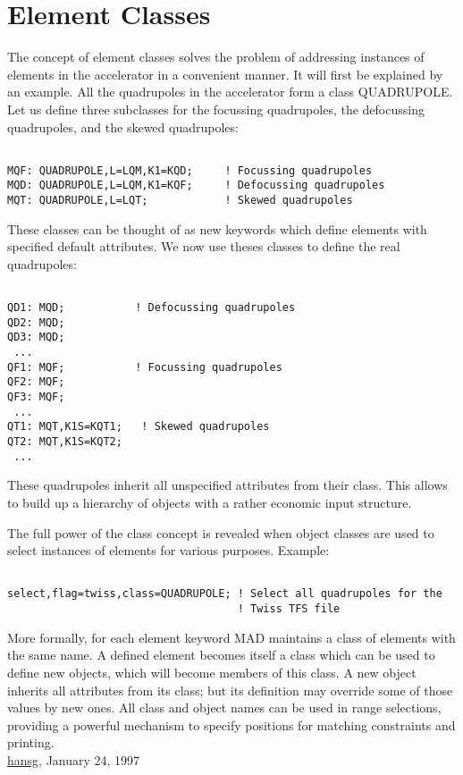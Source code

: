 




\section{Element Classes}  The concept of element classes solves the problem of addressing instances of elements in the accelerator in a convenient manner. It will first be explained by an example. All the quadrupoles in the accelerator form a class QUADRUPOLE. Let us define three subclasses for the focussing quadrupoles, the defocussing quadrupoles, and the skewed quadrupoles: 
\begin{verbatim}

MQF: QUADRUPOLE,L=LQM,K1=KQD;     ! Focussing quadrupoles
MQD: QUADRUPOLE,L=LQM,K1=KQF;     ! Defocussing quadrupoles
MQT: QUADRUPOLE,L=LQT;            ! Skewed quadrupoles
\end{verbatim} These classes can be thought of as new keywords which define elements with specified default attributes. We now use theses classes to define the real quadrupoles: 
\begin{verbatim}

QD1: MQD;           ! Defocussing quadrupoles
QD2: MQD;
QD3: MQD;
 ...
QF1: MQF;           ! Focussing quadrupoles
QF2: MQF;
QF3: MQF;
 ...
QT1: MQT,K1S=KQT1;   ! Skewed quadrupoles
QT2: MQT,K1S=KQT2;
 ...
\end{verbatim} These quadrupoles inherit all unspecified attributes from their class. This allows to build up a hierarchy of objects with a rather economic input structure. 

 The full power of the class concept is revealed when object classes are used to select instances of elements for various purposes. Example: 
\begin{verbatim}

select,flag=twiss,class=QUADRUPOLE; ! Select all quadrupoles for the
                                    ! Twiss TFS file
\end{verbatim}

 More formally, for each element keyword MAD maintains a class of elements with the same name. A defined element becomes itself a class which can be used to define new objects, which will become members of this class. A new object inherits all attributes from its class; but its definition may override some of those values by new ones. All class and object names can be used in range selections, providing a powerful mechanism to specify positions for matching constraints and printing. 
\\ 
 \href{http://www.cern.ch/Hans.Grote/hansg_sign.html}{hansg}, January 24, 1997 

